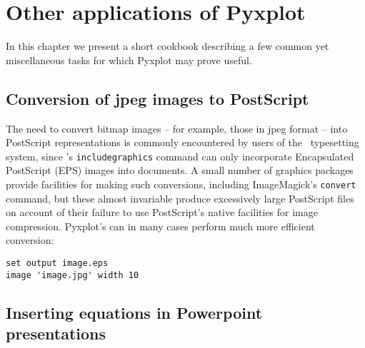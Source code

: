 %
%
%
%
%



\chapter{Other applications of Pyxplot}

In this chapter we present a short cookbook describing a few common yet
miscellaneous tasks for which Pyxplot may prove useful.

\section{Conversion of jpeg images to PostScript}

The need to convert bitmap images -- for example, those in jpeg format -- into
PostScript representations is commonly encountered by users of the \latexdcf\
typesetting system, since \latexdcf's {\tt includegraphics} command can only
incorporate Encapsulated PostScript (EPS) images into documents.  A small
number of graphics packages provide facilities for making such conversions,
including ImageMagick\index{ImageMagick}'s {\tt convert} command, but these
almost invariable produce excessively large PostScript files on account of
their failure to use PostScript's native facilities for image compression.
Pyxplot's \indcmdt{image} can in many cases perform much more efficient
conversion:

\begin{verbatim}
set output image.eps
image 'image.jpg' width 10
\end{verbatim}

\section{Inserting equations in Powerpoint presentations}

